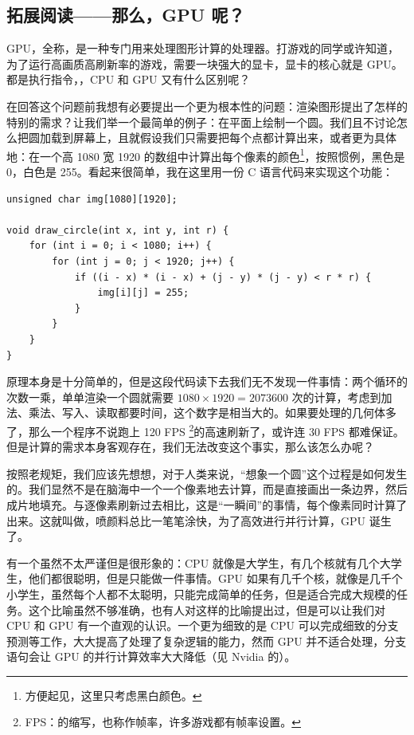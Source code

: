 \newpage

\subsection*{拓展阅读——那么，GPU 呢？}

GPU，全称，是一种专门用来处理图形计算的处理器。打游戏的同学或许知道，为了运行高画质高刷新率的游戏，需要一块强大的显卡，显卡的核心就是 GPU。都是执行指令，，CPU 和 GPU 又有什么区别呢？

在回答这个问题前我想有必要提出一个更为根本性的问题：渲染图形提出了怎样的特别的需求？让我们举一个最简单的例子：在平面上绘制一个圆。我们且不讨论怎么把圆加载到屏幕上，且就假设我们只需要把每个点都计算出来，或者更为具体地：在一个高 1080 宽 1920 的数组中计算出每个像素的颜色\footnote{方便起见，这里只考虑黑白颜色。}，按照惯例，黑色是 0，白色是 255。看起来很简单，我在这里用一份 C 语言代码来实现这个功能：
\begin{verbatim}
unsigned char img[1080][1920];

void draw_circle(int x, int y, int r) {
    for (int i = 0; i < 1080; i++) {
        for (int j = 0; j < 1920; j++) {
            if ((i - x) * (i - x) + (j - y) * (j - y) < r * r) {
                img[i][j] = 255;
            }
        }
    }
}
\end{verbatim}

原理本身是十分简单的，但是这段代码读下去我们无不发现一件事情：两个循环的次数一乘，单单渲染一个圆就需要 $1080 \times 1920 = 2073600$ 次的计算，考虑到加法、乘法、写入、读取都要时间，这个数字是相当大的。如果要处理的几何体多了，那么一个程序不说跑上 120 FPS \footnote{FPS：的缩写，也称作帧率，许多游戏都有帧率设置。}的高速刷新了，或许连 30 FPS 都难保证。但是计算的需求本身客观存在，我们无法改变这个事实，那么该怎么办呢？

按照老规矩，我们应该先想想，对于人类来说，“想象一个圆”这个过程是如何发生的。我们显然不是在脑海中一个一个像素地去计算，而是直接画出一条边界，然后成片地填充。与逐像素刷新过去相比，这是“一瞬间”的事情，每个像素同时计算了出来。这就叫做，喷颜料总比一笔笔涂快，为了高效进行并行计算，GPU 诞生了。

有一个虽然不太严谨但是很形象的：CPU 就像是大学生，有几个核就有几个大学生，他们都很聪明，但是只能做一件事情。GPU 如果有几千个核，就像是几千个小学生，虽然每个人都不太聪明，只能完成简单的任务，但是适合完成大规模的任务。这个比喻虽然不够准确，也有人对这样的比喻提出过，但是可以让我们对 CPU 和 GPU 有一个直观的认识。一个更为细致的是 CPU 可以完成细致的分支预测等工作，大大提高了处理了复杂逻辑的能力，然而 GPU 并不适合处理，分支语句会让 GPU 的并行计算效率大大降低（见 Nvidia 的）。

